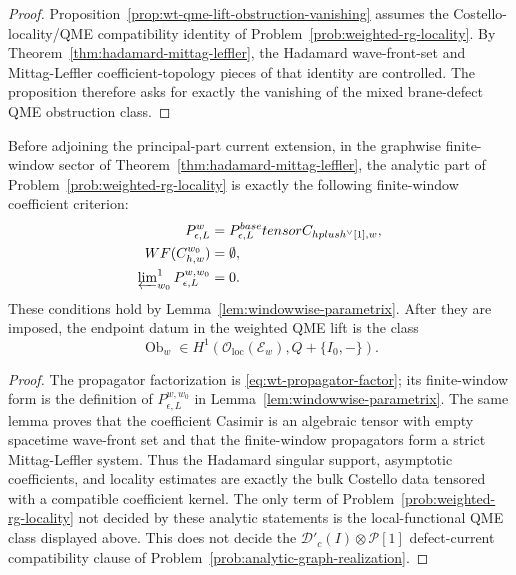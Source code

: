 \begin{proof}
  Proposition~\ref{prop:wt-qme-lift-obstruction-vanishing} assumes the
  Costello-locality/QME compatibility identity of
  Problem~\ref{prob:weighted-rg-locality}. By
  Theorem~\ref{thm:hadamard-mittag-leffler}, the Hadamard
  wave-front-set and Mittag-Leffler coefficient-topology pieces of
  that identity are controlled.  The proposition therefore asks for
  exactly the vanishing of the mixed brane-defect QME obstruction class.
\end{proof}

\begin{thm}\label{thm:weighted-rg-locality-reduced}
  Before adjoining the principal-part current extension, in the graphwise
  finite-window sector of
  Theorem~\ref{thm:hadamard-mittag-leffler}, the analytic part of
  Problem~\ref{prob:weighted-rg-locality} is exactly the following
  finite-window coefficient criterion:
  \[
  \begin{aligned}
    P_{\epsilon,L}^{w}
      &=P_{\epsilon,L}^{\mathrm{base}}\widehat\otimes
        C_{\mathfrak h\oplus\mathfrak h^\vee[1],w},\\
    \mathrm{WF}(C_{\mathfrak h,w}^{w_0})
      &=\emptyset,\\
    \varprojlim\nolimits^1_{w_0}P_{\epsilon,L}^{w,w_0}
      &=0.
  \end{aligned}
  \]
  These conditions hold by Lemma~\ref{lem:windowwise-parametrix}.  After
  they are imposed, the endpoint datum in the weighted QME lift is the
  class
  \[
    \operatorname{Ob}_{w}\in
    H^1(\mathcal O_{\mathrm{loc}}(\mathcal E_w),Q+\{I_0,-\}).
  \]
\end{thm}

\begin{proof}
  The propagator factorization is \eqref{eq:wt-propagator-factor}; its
  finite-window form is the definition of \(P_{\epsilon,L}^{w,w_0}\) in
  Lemma~\ref{lem:windowwise-parametrix}.  The same lemma proves that the
  coefficient Casimir is an algebraic tensor with empty spacetime
  wave-front set and that the finite-window propagators form a strict
  Mittag-Leffler system.  Thus the Hadamard singular support, asymptotic
  coefficients, and locality estimates are exactly the bulk Costello
  data tensored with a compatible coefficient kernel.  The only term of
  Problem~\ref{prob:weighted-rg-locality} not decided by these analytic
  statements is the local-functional QME class displayed above. This does
  not decide the \(\mathcal D'_c(I)\otimes\mathcal P[1]\)
  defect-current compatibility clause of
  Problem~\ref{prob:analytic-graph-realization}.
\end{proof}

